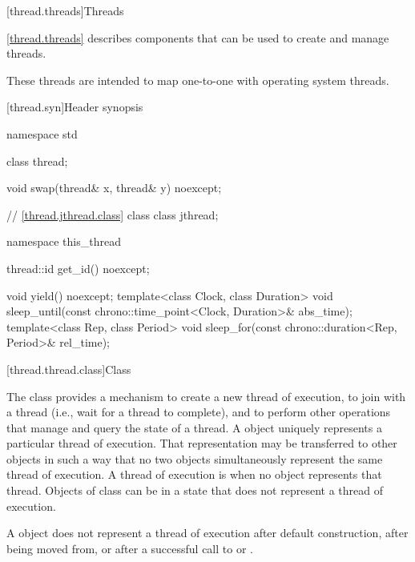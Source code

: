 [thread.threads]{Threads}

\pnum
\ref{thread.threads} describes components that can be used to create and manage threads.
\begin{note}
These threads are intended to map one-to-one with operating system threads.
\end{note}

[thread.syn]{Header  synopsis}

%
\begin{codeblock}
namespace std {
  class thread;

  void swap(thread& x, thread& y) noexcept;

  // \ref{thread.jthread.class} class 
  class jthread;

  namespace this_thread {
    thread::id get_id() noexcept;

    void yield() noexcept;
    template<class Clock, class Duration>
      void sleep_until(const chrono::time_point<Clock, Duration>& abs_time);
    template<class Rep, class Period>
      void sleep_for(const chrono::duration<Rep, Period>& rel_time);
  }
}
\end{codeblock}

[thread.thread.class]{Class }

\pnum
The class  provides a mechanism to create a new thread of execution, to join with
a thread (i.e., wait for a thread to complete), and to perform other operations that manage and
query the state of a thread. A  object uniquely represents a particular thread of
execution. That representation may be transferred to other  objects in such a way
that no two  objects simultaneously represent the same thread of execution. A
thread of execution is  when no  object represents that thread.
Objects of class  can be in a state that does not represent a thread of
execution.
\begin{note}
A  object does not represent a thread of execution after
default construction, after being moved from, or after a successful call to  or
.
\end{note}

